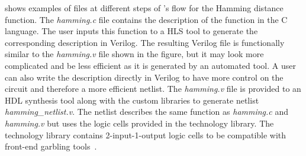  shows examples of files at different steps of \sys{}'s flow for the Hamming distance function.
The \textsl{hamming.c} file contains the description of the function in the C language.
The user inputs this function to a HLS tool to generate the corresponding description in Verilog.
The resulting Verilog file is functionally similar to the \textsl{hamming.v} file shown in the figure, but it may look more complicated and be less efficient as it is generated by an automated tool.
A user can also write the description directly in Verilog to have more control on the circuit and therefore a more efficient netlist.
The \textsl{hamming.v} file is provided to an HDL synthesis tool along with the \sys{} custom libraries to generate netlist \textsl{hamming\_netlist.v}.
The netlist describes the same function as \textsl{hamming.c} and \textsl{hamming.v} but uses the logic cells provided in the technology library.
The technology library contains 2-input-1-output logic cells to be compatible with front-end garbling tools~\cite{malkhi2004fairplay, bellare2013efficient}.
